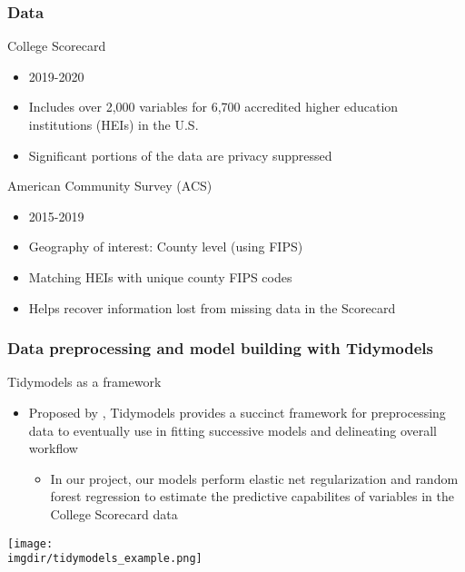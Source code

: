 \documentclass[aspectratio=169, t, 10pt]{beamer}
\begin{document}
\begin{frame}
  \frametitle{Data}
    \begin{block}{College Scorecard}
      \begin{itemize}
      \item 2019-2020 
      \item Includes over 2,000 variables for 6,700 accredited higher
        education institutions (HEIs) in the U.S.
      \item Significant portions of the data are privacy suppressed
      \end{itemize}
    \end{block}
  \begin{block}{American Community Survey (ACS)}
    \begin{itemize}
    \item 2015-2019
    \item Geography of interest: County level (using FIPS)
    \item Matching HEIs with unique county FIPS codes
    \item Helps recover information lost from missing data in the Scorecard
    \end{itemize}
  \end{block}
\end{frame}

\begin{frame}
  \frametitle{Data preprocessing and model building with Tidymodels}
  \begin{block}{Tidymodels as a framework}
    \begin{itemize}
    \item Proposed by \citet{Kuhn_Silge_2022}, Tidymodels provides a
      succinct framework for preprocessing data to eventually use in
      fitting successive models and delineating overall workflow
      \begin{itemize}
        \item In our project, our models perform elastic net
          regularization and random forest regression to estimate the
          predictive capabilites of variables in the College Scorecard
          data
      \end{itemize}
     \end{itemize}
   \end{block}
   \begin{block}{}
     \vspace{-0.25cm}%
     \centering
        \texttt{[image: \\imgdir/tidymodels\_example.png]}
      \end{block}   
\end{frame}
\end{document}
